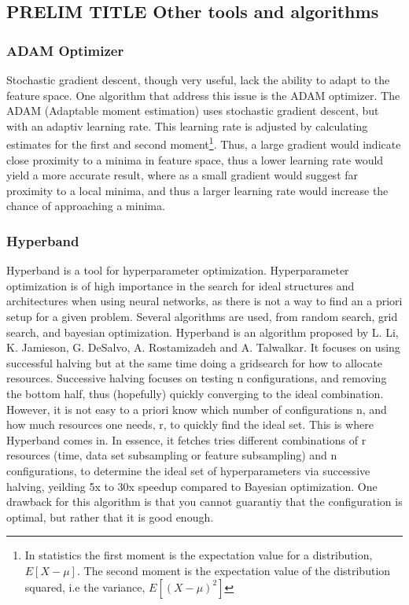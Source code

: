 \subsection*{PRELIM TITLE Other tools and algorithms}
\subsubsection*{ADAM Optimizer}
Stochastic gradient descent, though very useful, lack the ability to adapt to the feature space. One algorithm that address this
issue is the ADAM optimizer\cite{ADAM:opti}. The ADAM (Adaptable moment estimation) uses stochastic gradient descent, but with 
an adaptiv learning rate. This learning rate is adjusted by calculating estimates for the first and second moment\footnote{In statistics
the first moment is the expectation value for a distribution, $E[X-\mu]$. The second moment is the 
expectation value of the distribution squared, i.e the variance, $E[(X-\mu)^2]$}. Thus, a large gradient would indicate close proximity 
to a minima in feature space, thus a lower learning rate would yield a more accurate result, 
where as a small gradient would suggest far proximity to a local minima, and thus a larger learning rate would increase the chance 
of approaching a minima.\par 

\subsubsection*{Hyperband}
Hyperband is a tool for hyperparameter optimization\cite{hyperband:opt}. Hyperparameter optimization is of high importance in the 
search for ideal structures and architectures when using neural networks, as there is not a way to find an a priori setup for a 
given problem. Several algorithms are used, from random search, grid search, and bayesian optimization. Hyperband is an algorithm 
proposed by L. Li, K. Jamieson, G. DeSalvo, A. Rostamizadeh and A. Talwalkar. It focuses on using successful halving\cite{successivehalving}
but at the same time doing a gridsearch for how to allocate resources. Successive halving focuses on testing n configurations, and removing 
the bottom half, thus (hopefully) quickly converging to the ideal combination. However, it is not easy to a priori know which 
number of configurations n, and how much resources one needs, r, to quickly find the ideal set. This is where Hyperband comes in. 
In essence, it fetches tries different combinations of r resources (time, data set subsampling or feature subsampling) and n 
configurations, to determine the ideal set of hyperparameters via successive halving, yeilding 5x to 30x speedup compared to 
Bayesian optimization. One drawback for this algorithm is that you cannot guarantiy that the configuration is optimal, 
but rather that it is good enough. 

